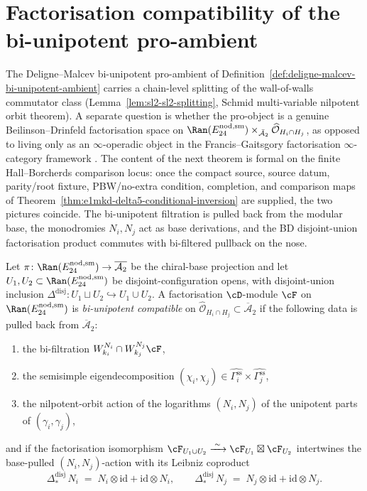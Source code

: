 \section{Factorisation compatibility of the bi-unipotent pro-ambient}
\label{sec:bd-factorisation-compatibility-bi-unipotent}

The Deligne--Malcev bi-unipotent pro-ambient of
Definition~\textup{\ref{def:deligne-malcev-bi-unipotent-ambient}} carries
a chain-level splitting of the wall-of-walls commutator class
(Lemma~\textup{\ref{lem:sl2-sl2-splitting}}, Schmid multi-variable
nilpotent orbit theorem). A separate question is whether the pro-object
is a genuine Beilinson--Drinfeld factorisation space on
$\Ran(E^{\mathrm{nod,sm}}_{24}) \times_{\bar{\mathcal A}_2}
\widehat{\mathcal O}_{H_i\cap H_j}$, as opposed to living only as an
$\infty$-operadic object in the Francis--Gaitsgory factorisation
$\infty$-category framework \cite{FrancisGaitsgory11,Gaitsgory15}. The
content of the next theorem is formal on the finite Hall--Borcherds
comparison locus: once the compact source, source datum,
parity/root fixture, PBW/no-extra condition, completion, and comparison
maps of Theorem~\textup{\ref{thm:e1mkd-delta5-conditional-inversion}}
are supplied, the two pictures coincide. The bi-unipotent filtration is
pulled back from the modular base, the monodromies $N_i,N_j$ act as
base derivations, and the BD disjoint-union factorisation product
commutes with bi-filtered pullback on the nose.

\begin{definition}
\label{def:factorisation-compatible-bifiltration}
%
%
Let $\pi\colon \Ran(E^{\mathrm{nod,sm}}_{24}) \to \overline{\mathcal{A}_2}$
be the chiral-base projection and let
$U_1,U_2 \subset \Ran(E^{\mathrm{nod,sm}}_{24})$ be disjoint-configuration
opens, with disjoint-union inclusion
$\Delta^{\mathrm{disj}}\colon U_1 \sqcup U_2 \hookrightarrow U_1 \cup U_2$.
A factorisation $\cD$-module $\cF$ on $\Ran(E^{\mathrm{nod,sm}}_{24})$ is
\emph{bi-unipotent compatible} on
$\widehat{\mathcal O}_{H_i\cap H_j}\subset\overline{\mathcal A}_2$ if the
following data is pulled back from $\overline{\mathcal A}_2$:
\begin{enumerate}[label=\textup{(\roman*)}]
\item the bi-filtration $W^{N_i}_{k_i}\cap W^{N_j}_{k_j}\cF$,
\item the semisimple eigendecomposition
$(\chi_i,\chi_j)\in\widehat{\Gamma_i^{\mathrm{ss}}}\times
\widehat{\Gamma_j^{\mathrm{ss}}}$,
\item the nilpotent-orbit action of the logarithms $(N_i,N_j)$ of the
unipotent parts of $(\gamma_i,\gamma_j)$,
\end{enumerate}
and if the factorisation isomorphism
$\cF_{U_1\cup U_2}\xrightarrow{\;\sim\;}\cF_{U_1}\boxtimes\cF_{U_2}$
intertwines the base-pulled $(N_i,N_j)$-action with its Leibniz coproduct
\[
\Delta^{\mathrm{disj}}_*\, N_i
\;=\;
N_i\otimes\mathrm{id}+\mathrm{id}\otimes N_i,
\qquad
\Delta^{\mathrm{disj}}_*\, N_j
\;=\;
N_j\otimes\mathrm{id}+\mathrm{id}\otimes N_j.
\]
\end{definition}

